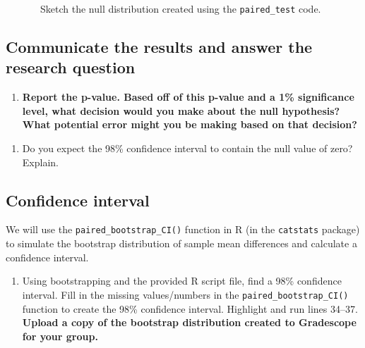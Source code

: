 \documentclass[
]{report}
\providecommand{\tightlist}{%
  \setlength{\itemsep}{0pt}\setlength{\parskip}{0pt}}
\begin{document}
~~~~~~~Sketch the null distribution created using the \texttt{paired\_test} code.

\vspace{1.5in}

\hypertarget{communicate-the-results-and-answer-the-research-question-2}{%
\subsection*{Communicate the results and answer the research question}\label{communicate-the-results-and-answer-the-research-question-2}}

\begin{enumerate}
\def\labelenumi{\arabic{enumi}.}
\setcounter{enumi}{10}
\tightlist
\item
  \textbf{Report the p-value. Based off of this p-value and a 1\% significance level, what decision would you make about the null hypothesis? What potential error might you be making based on that decision?}
\end{enumerate}

\vspace{0.5in}

\begin{enumerate}
\def\labelenumi{\arabic{enumi}.}
\setcounter{enumi}{11}
\tightlist
\item
  Do you expect the 98\% confidence interval to contain the null value of zero? Explain.
\end{enumerate}

\vspace{0.8in}

\hypertarget{confidence-interval-6}{%
\subsection*{Confidence interval}\label{confidence-interval-6}}

We will use the \texttt{paired\_bootstrap\_CI()} function in R (in the \texttt{catstats} package) to simulate the bootstrap distribution of sample mean differences and calculate a confidence interval.

\begin{enumerate}
\def\labelenumi{\arabic{enumi}.}
\setcounter{enumi}{12}
\tightlist
\item
  Using bootstrapping and the provided R script file, find a 98\% confidence interval. Fill in the missing values/numbers in the \texttt{paired\_bootstrap\_CI()} function to create the 98\% confidence interval. Highlight and run lines 34--37. \textbf{Upload a copy of the bootstrap distribution created to Gradescope for your group.}
\end{enumerate}
\end{document}
